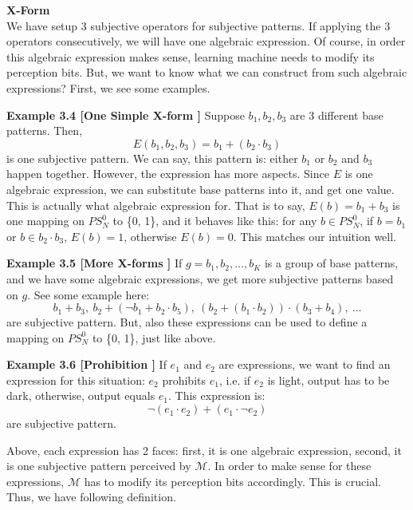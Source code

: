 {\bf X-Form} \\
We have setup 3 subjective operators for subjective patterns. If applying the 3 operators consecutively, we will have one algebraic expression. Of course, in order this algebraic expression makes sense, learning machine needs to modify its perception bits. But, we want to know what we can construct from such algebraic expressions? First, we see some examples.

{\bf Example 3.4 [\bf One Simple X-form ]}
Suppose $b_1, b_2, b_3$ are 3 different base patterns. Then,
$$
E(b_1, b_2, b_3) = b_1 + (b_ 2 \cdot b_3)
$$
is one subjective pattern. We can say, this pattern is: either $b_1$ or $b_2$ and $b_3$ happen together. However, the expression has more aspects. Since $E$ is one algebraic expression, we can substitute base patterns into it, and get one value. This is actually what algebraic expression for. That is to say, $E(b) = b_1 + b_3$ is one mapping on $PS_N^0$ to \{0, 1\}, and it behaves like this: for any $b \in PS_N^0$, if $b = b_1$ or $b \in b_2 \cdot b_3$, $E(b) = 1$, otherwise $E(b) = 0$. This matches our intuition well.  


{\bf Example 3.5 [\bf More X-forms ]}
If $g = {b_1, b_2, \ldots, b_K}$ is a group of base patterns, and we have some algebraic expressions, we get more subjective patterns based on $g$. See some example here: 
$$
b_1 + b_3, \ b_2 + (\neg b_1 + b_2 \cdot b_5), \ (b_2 + (b_1 \cdot b_2)) \cdot (b_3 + b_4), \ \ldots
$$
are subjective pattern. But, also these expressions can be used to define a mapping on  $PS_N^0$ to \{0, 1\}, just like above. 


{\bf Example 3.6 [\bf Prohibition ]}
If $e_1$ and $e_2$ are expressions, we want to find an expression for this situation: $e_2$ prohibits $e_1$, i.e. if $e_2$ is light, output has to be dark, otherwise, output equals $e_1$. This expression is:
$$
\neg (e_1 \cdot e_2) + (e_1  \cdot \neg e_2)
$$
are subjective pattern.




Above, each expression has 2 faces: first, it is one algebraic expression, second, it is one subjective pattern perceived by $\mathcal{M}$. In order to make sense for these expressions, $\mathcal{M}$ has to modify its perception bits accordingly. This is crucial. Thus, we have following definition.


